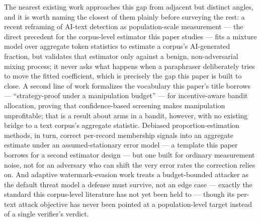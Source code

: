 \documentclass[11pt]{article}
\begin{document}
The nearest existing work approaches this gap from adjacent but distinct angles, and it is worth naming the closest of them plainly before surveying the rest: a recent reframing of AI-text detection as population-scale measurement --- the direct precedent for the corpus-level estimator this paper studies --- fits a mixture model over aggregate token statistics to estimate a corpus's AI-generated fraction, but validates that estimator only against a benign, non-adversarial mixing process; it never asks what happens when a paraphraser deliberately tries to move the fitted coefficient, which is precisely the gap this paper is built to close. A second line of work formalizes the vocabulary this paper's title borrows --- ``strategy-proof under a manipulation budget'' --- for incentive-aware bandit allocation, proving that confidence-based screening makes manipulation unprofitable; that is a result about arms in a bandit, however, with no existing bridge to a text corpus's aggregate statistic. Debiased proportion-estimation methods, in turn, correct per-record membership signals into an aggregate estimate under an assumed-stationary error model --- a template this paper borrows for a second estimator design --- but one built for ordinary measurement noise, not for an adversary who can shift the very error rates the correction relies on. And adaptive watermark-evasion work treats a budget-bounded attacker as the default threat model a defense must survive, not an edge case --- exactly the standard this corpus-level literature has not yet been held to --- though its per-text attack objective has never been pointed at a population-level target instead of a single verifier's verdict.
\end{document}
